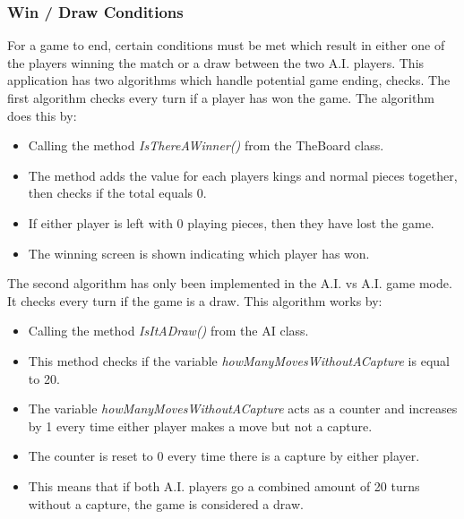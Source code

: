 \documentclass[10pt, a4paper]{article}
\begin{document}
 
 
 
 
 
 
 \subsubsection{Win / Draw Conditions}
 For a game to end, certain conditions must be met which result in either one of the players winning the match or a draw between the two A.I. players. This application has two algorithms which handle potential game ending, checks. The first algorithm checks every turn if a player has won the game.
 \newline
 The algorithm does this by:
 
 \begin{itemize}
 	\item Calling the method \textit{IsThereAWinner()} from the TheBoard class.
 	\item The method adds the value for each players kings and normal pieces together, then checks if the total equals 0.
 	\item If either player is left with 0 playing pieces, then they have lost the game.
 	\item The winning screen is shown indicating which player has won.
 \end{itemize}
 
 The second algorithm has only been implemented in the A.I. vs A.I. game mode. It checks every turn if the game is a draw.
 \newline
 This algorithm works by:
 
 \begin{itemize}
 	\item Calling the method \textit{IsItADraw()} from the AI class.
 	\item This method checks if the variable \textit{howManyMovesWithoutACapture} is equal to 20.
 	\item The variable \textit{howManyMovesWithoutACapture} acts as a counter and increases by 1 every time either player makes a move but not a capture.
 	\item The counter is reset to 0 every time there is a capture by either player.
 	\item This means that if both A.I. players go a combined amount of 20 turns without a capture, the game is considered a draw.
 \end{itemize}
 
 
 
 
 
\end{document}
